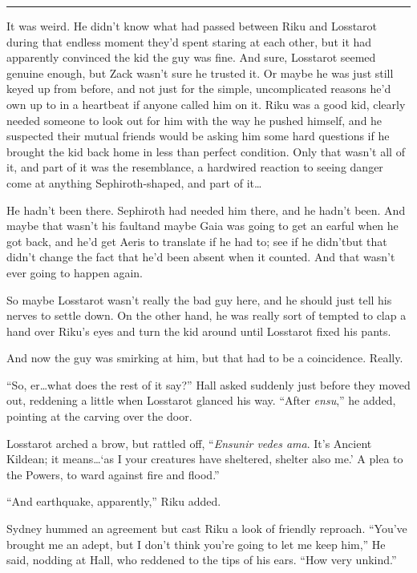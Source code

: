 \fancybreak{\pfbreakdisplay}


It was weird. He didn't know what had passed between Riku and Losstarot during that endless moment they'd spent staring at each other, but it had apparently convinced the kid the guy was fine. And sure, Losstarot seemed genuine enough, but Zack wasn't sure he trusted it. Or maybe he was just still keyed up from before, and not just for the simple, uncomplicated reasons he'd own up to in a heartbeat if anyone called him on it. Riku was a good kid, clearly needed someone to look out for him with the way he pushed himself, and he suspected their mutual friends would be asking him some hard questions if he brought the kid back home in less than perfect condition. Only that wasn't all of it, and part of it was the resemblance, a hardwired reaction to seeing danger come at anything Sephiroth-shaped, and part of it\ldots

He hadn't been there. Sephiroth had needed him there, and he hadn't been. And maybe that wasn't his fault\textemdash and maybe Gaia was going to get an earful when he got back, and he'd get Aeris to translate if he had to; see if he didn't\textemdash but that didn't change the fact that he'd been absent when it counted. And that wasn't ever going to happen again.

So maybe Losstarot wasn't really the bad guy here, and he should just tell his nerves to settle down. On the other hand, he was really sort of tempted to clap a hand over Riku's eyes and turn the kid around until Losstarot fixed his pants.

And now the guy was smirking at him, but that had to be a coincidence. Really.

``So, er\ldots what does the rest of it say?'' Hall asked suddenly just before they moved out, reddening a little when Losstarot glanced his way. ``After \emph{ensu},'' he added, pointing at the carving over the door.

Losstarot arched a brow, but rattled off, ``\emph{Ensunir vedes ama}. It's Ancient Kildean; it means\ldots `as I your creatures have sheltered, shelter also me.' A plea to the Powers, to ward against fire and flood.''

``And earthquake, apparently,'' Riku added.

Sydney hummed an agreement but cast Riku a look of friendly reproach. ``You've brought me an adept, but I don't think you're going to let me keep him,'' He said, nodding at Hall, who reddened to the tips of his ears. ``How very unkind.''

